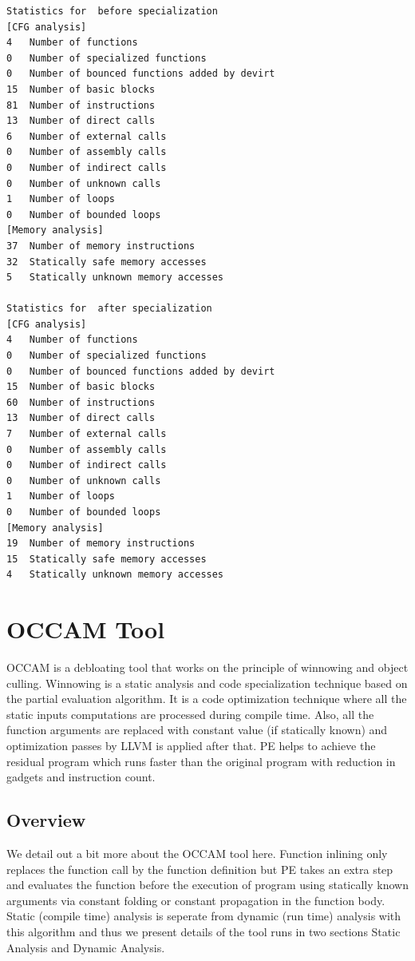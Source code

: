 \documentclass{relatorio}
\begin{document}
\begin{lstlisting}
Statistics for  before specialization
[CFG analysis]
4 	Number of functions
0 	Number of specialized functions
0 	Number of bounced functions added by devirt
15 	Number of basic blocks
81 	Number of instructions
13 	Number of direct calls
6 	Number of external calls
0 	Number of assembly calls
0 	Number of indirect calls
0 	Number of unknown calls
1 	Number of loops   
0 	Number of bounded loops
[Memory analysis]
37 	Number of memory instructions
32 	Statically safe memory accesses
5 	Statically unknown memory accesses

Statistics for  after specialization
[CFG analysis]
4 	Number of functions
0 	Number of specialized functions
0 	Number of bounced functions added by devirt
15	Number of basic blocks
60 	Number of instructions
13 	Number of direct calls
7 	Number of external calls
0 	Number of assembly calls
0 	Number of indirect calls
0 	Number of unknown calls
1 	Number of loops   
0 	Number of bounded loops
[Memory analysis]
19 	Number of memory instructions
15 	Statically safe memory accesses
4 	Statically unknown memory accesses
\end{lstlisting} 

\section{OCCAM Tool}%
\label{Tools}

OCCAM is a debloating tool that works on the principle of winnowing and object culling. Winnowing is a static analysis and code specialization technique based on the partial evaluation algorithm. It is a code optimization technique where all the static inputs computations are processed during compile time. Also, all the function arguments 
are replaced with constant value (if statically known) and optimization passes by LLVM is applied after that. PE helps to achieve the residual program which runs faster than the original program with reduction in gadgets and instruction count. 

\subsection{Overview}%
\label{Tools}

We detail out a bit more about the OCCAM tool here. Function inlining only replaces the function call by the function definition but PE takes an extra step and evaluates the function before the execution of program using statically known arguments via constant folding or constant propagation in the function body. Static (compile time) analysis is seperate from dynamic (run time) analysis with this algorithm 
and thus we present details of the tool runs in two sections Static Analysis and Dynamic Analysis.
\end{document}
